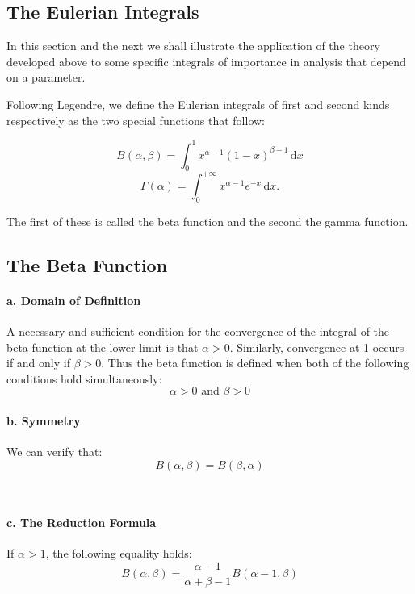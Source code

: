 \documentclass[a4paper,12pt]{article}
\begin{document}
\begin{CJK}{UTF8}{gbsn}
    \section{The Eulerian Integrals}
    In this section and the next we shall illustrate the application of the theory 
    developed above to some specific integrals of importance in analysis that 
    depend on a parameter.

    Following Legendre, we define the Eulerian integrals of first and second 
    kinds respectively as the two special functions that follow:

    \begin{equation}
        B(\alpha, \beta) = \int_0^1x^{\alpha - 1}(1-x)^{\beta - 1}\, \mathrm{d}x
    \end{equation}
    \begin{equation}
        \Gamma(\alpha) = \int_0^{+\infty} x^{\alpha - 1} e^{-x}\, \mathrm{d}x.
    \end{equation}

    The first of these is called the beta function and the second the gamma function.

    \subsection{The Beta Function}
    \paragraph{\rm \textbf{a. Domain of Definition}}
    A necessary and sufficient condition for the convergence of the integral of the 
    beta function at the lower limit is that $\alpha > 0$. Similarly, convergence at 1
    occurs if and only if $\beta > 0.$ Thus the beta function is defined when both
    of the following conditions hold simultaneously:
    \[
        \alpha > 0 \text{ and } \beta > 0
        \]

    \paragraph{\rm \textbf{b. Symmetry}}
    We can verify that:
    \[
        B(\alpha, \beta) = B(\beta, \alpha)
        \]
    
    \

    \paragraph{\rm \textbf{c. The Reduction Formula}}
    If $\alpha > 1$, the following equality holds:
    \[
        B(\alpha, \beta) = \frac{\alpha - 1}{\alpha + \beta - 1}B(\alpha - 1, \beta)
        \]


\end{CJK}
\end{document}
